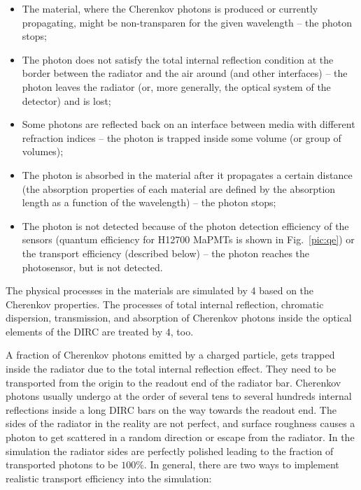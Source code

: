 \begin{itemize}
\item The material, where the Cherenkov photons is produced or currently propagating, might be non-transparen for the given wavelength -- the photon stops;
\item The photon does not satisfy the total internal reflection condition at the border between the radiator and the air around (and other interfaces) -- the photon leaves the radiator (or, more generally, the optical system of the detector) and is lost;
\item Some photons are reflected back on an interface between media with different refraction indices -- the photon is trapped inside some volume (or group of volumes);
\item The photon is absorbed in the material after it propagates a certain distance (the absorption properties of each material are defined by the absorption length as a function of the wavelength) -- the photon stops;
\item The photon is not detected because of the photon detection efficiency of the sensors (quantum efficiency for H12700 MaPMTs is shown in Fig.~\ref{pic:qe}) or the transport efficiency (described below)  -- the photon reaches the photosensor, but is not detected.
\end{itemize}

The physical processes in the materials are simulated by {\geant}4 based on the Cherenkov properties. The processes of total internal reflection, chromatic dispersion, transmission, and absorption of Cherenkov photons inside the optical elements of the \gluex DIRC are treated by {\geant}4, too.

A fraction of Cherenkov photons emitted by a charged particle, gets trapped inside the radiator due to the total internal reflection effect. They need to be transported from the origin to the readout end of the radiator bar. Cherenkov photons usually undergo at the order of several tens to several hundreds internal reflections inside a long \babar DIRC bars on the way towards the readout end. The sides of the radiator in the reality are not perfect, and surface roughness causes a photon to get scattered in a random direction or escape from the radiator. In the simulation the radiator sides are perfectly polished leading to the fraction of transported photons to be $100\%$. In general, there are two ways to implement realistic transport efficiency into the simulation:

